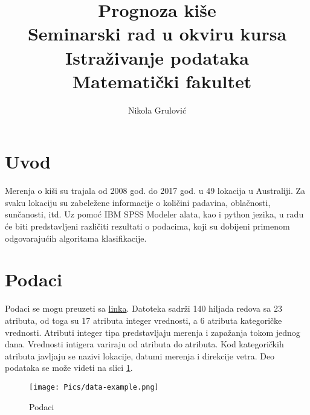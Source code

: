 \documentclass[a4paper]{article}
\begin{document}
\title{Prognoza kiše\\ \small{Seminarski rad u okviru kursa\\Istraživanje podataka\\\ Matematički fakultet}}

\author{Nikola Grulović}


\maketitle



\tableofcontents

\newpage

\section{Uvod}
\label{sec:uvod}
Merenja o kiši su trajala od 2008 god. do 2017 god. u 49 lokacija u  Australiji. Za svaku lokaciju su zabeležene informacije o količini padavina, oblačnosti, sunčanosti, itd. Uz pomoć IBM SPSS Modeler alata, kao i python jezika, u radu će biti predstavljeni različiti rezultati o podacima, koji su dobijeni primenom odgovarajućih algoritama klasifikacije. 

\section{Podaci}
\label{sec:Podaci}
Podaci se mogu preuzeti sa \href{https://www.kaggle.com/jsphyg/weather-dataset-rattle-package}{linka}. Datoteka sadrži 140 hiljada redova sa 23 atributa, od toga su 17 atributa integer vrednosti, a 6 atributa kategoričke vrednosti. Atributi integer tipa predstavljaju merenja i zapažanja tokom jednog dana. Vrednosti intigera variraju od atributa do atributa. Kod kategoričkih atributa javljaju se  nazivi lokacije, datumi merenja i direkcije vetra. Deo podataka se može videti na slici \ref{fig:data-example}.\par


\begin{figure}[ht]
 \centering
 \texttt{[image: Pics/data-example.png]}
 \caption{Podaci}
 \label{fig:data-example}
\end{figure}
\end{document}
